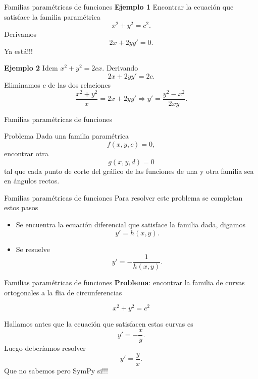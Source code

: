 \documentclass[handout,hyperref={colorlinks=true}]{beamer}
\begin{document}
\begin{frame}{Familias paramétricas de funciones} 
\textbf{Ejemplo 1} Encontrar la ecuación que satisface la familia paramétrica
\[x^2+y^2=c^2.\]
Derivamos
\[2x+2yy'=0.\]
Ya está!!!

\textbf{Ejemplo 2} Idem $x^2+y^2=2cx$.  Derivando
\[2x+2yy'=2c.\]
Eliminamos $c$ de las dos relaciones
\[\frac{x^2+y^2}{x}=2x+2yy'\Rightarrow \boxed{y'=\frac{y^2-x^2}{2xy}}.\]

\end{frame}

\begin{frame}{Familias paramétricas de funciones} 
\begin{block}{Problema}
 Dada una familia paramétrica
 \[f(x,y,c)=0,\]
 encontrar otra
 \[g(x,y,d)=0\]
 tal que cada punto de corte del gráfico de las funciones de una y otra familia sea en ángulos rectos. 
\end{block}


\end{frame}

\begin{frame}{Familias paramétricas de funciones} 
Para resolver este problema se completan estos pasos
\begin{itemize}
 \item Se encuentra la ecuación diferencial que satisface la familia dada, digamos
 \[y'=h(x,y).\]
 \item Se resuelve
 \[y'=-\frac{1}{h(x,y)}.\]
\end{itemize}



\end{frame}

\begin{frame}{Familias paramétricas de funciones} 
 \textbf{Problema}: encontrar la familia de curvas ortogonales a la flia de circunferencias

\[x^2+y^2=c^2\]

Hallamos antes que la ecuación que satisfacen estas curvas es
\[y'=-\frac{x}{y}.\]
Luego deberíamos resolver
\[y'=\frac{y}{x}.\]
Que no sabemos pero SymPy si!!!


\end{frame}
\end{document}
